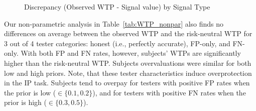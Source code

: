 \documentclass[12pt,a4paper]{article}
\begin{document}
\begin{figure}[H]\centering 
	\caption{Discrepancy (Observed WTP - Signal value) by Signal Type} \label{fig:WTPhist}
	\hfill
	\hfill
	\vspace{2em}
	\hfill
	\hfill

\end{figure}

Our non-parametric analysis in Table~\ref{tab:WTP_nonpar} also finds no differences on average between the observed WTP and the risk-neutral WTP for 3 out of 4 tester categories: honest (i.e., perfectly accurate), FP-only, and FN-only. With both FP and FN rates, however, subjects' WTPs are significantly higher than the risk-neutral WTP. Subjects overvaluations were similar for both low and high priors. Note, that these tester characteristics induce overprotection in the IP task. Subjects tend to overpay for testers with positive FP rates when the prior is low ($\in \{0.1,0.2\}$), and for testers with positive FN rates when the prior is high ($\in \{0.3,0.5\}$).
\end{document}
